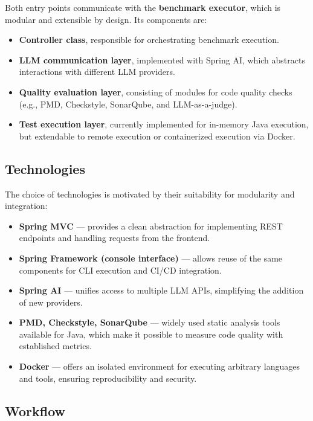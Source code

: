 Both entry points communicate with the \textbf{benchmark executor}, which is modular and extensible by design.
Its components are:
\begin{itemize}
    \item \textbf{Controller class}, responsible for orchestrating benchmark execution.
    \item \textbf{LLM communication layer}, implemented with Spring AI, which abstracts interactions with different LLM providers.
    \item \textbf{Quality evaluation layer}, consisting of modules for code quality checks (e.g., PMD, Checkstyle, SonarQube, and LLM-as-a-judge).
    \item \textbf{Test execution layer}, currently implemented for in-memory Java execution, but extendable to remote execution or containerized execution via Docker.
\end{itemize}

\subsection{Technologies}

The choice of technologies is motivated by their suitability for modularity and integration:
\begin{itemize}
    \item \textbf{Spring MVC} --- provides a clean abstraction for implementing REST endpoints and handling requests from the frontend.
    \item \textbf{Spring Framework (console interface)} --- allows reuse of the same components for CLI execution and CI/CD integration.
    \item \textbf{Spring AI} --- unifies access to multiple LLM APIs, simplifying the addition of new providers.
    \item \textbf{PMD, Checkstyle, SonarQube} --- widely used static analysis tools available for Java, which make it possible to measure code quality with established metrics.
    \item \textbf{Docker} --- offers an isolated environment for executing arbitrary languages and tools, ensuring reproducibility and security.
\end{itemize}

\subsection{Workflow}

